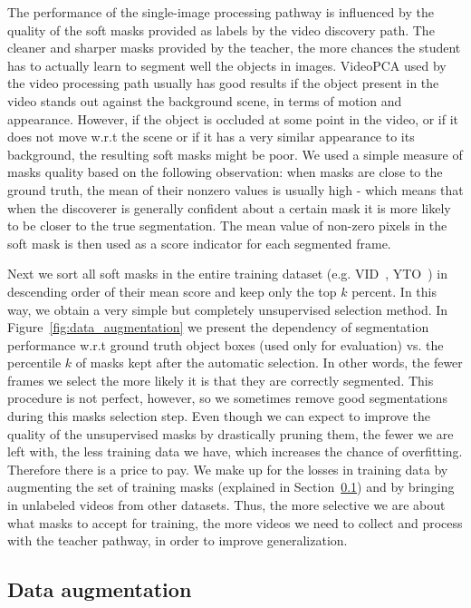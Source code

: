 \documentclass[10pt,twocolumn,letterpaper]{article}
\begin{document}
The performance of the single-image processing pathway is influenced by the quality of the 
soft masks provided as labels by the video discovery path. The cleaner and sharper masks provided by the teacher, the more chances the student has to actually learn to segment well the objects in images. VideoPCA used by the video processing path 
usually has good results if the object present in the video stands out against the background scene, in terms of motion and appearance.
However, if the object
is occluded at some point in the video, or if it does not move w.r.t the scene or if it has a very similar appearance to its background, the resulting soft masks might 
be poor.  We used a simple measure of masks quality based on the following observation: when masks are close to the ground truth, the mean of their nonzero values is usually high - which means that when the discoverer is generally confident about a certain mask it is more likely to be closer to the true segmentation.
The mean value of non-zero pixels in the soft mask 
is then used as a score indicator for each segmented frame. 

Next we sort all soft masks in the entire training dataset (e.g. VID~\cite{russakovsky2015imagenet}, YTO~\cite{prest2012learning}) in descending order of their mean score and keep only the top $k$ percent. In this way, we obtain a very simple but completely unsupervised selection method.
In Figure~\ref{fig:data_augmentation} we present the dependency of segmentation performance w.r.t ground truth object boxes (used only for evaluation) vs. the percentile $k$ of masks kept after the automatic selection. In other words, the fewer frames we select the more likely it is that they are correctly segmented. This procedure is not perfect, however, so we sometimes remove good segmentations during this masks selection step.
Even though we can expect to improve the quality of the unsupervised masks by drastically pruning them, the fewer we are left with, the less training data we have, which increases the chance of overfitting. Therefore there is a price to pay. We make up for the losses in training data by augmenting the set of training masks (explained in Section~\ref{sec:data_augmentation}) and by bringing in unlabeled videos from other datasets. Thus, the more selective we are about what masks to accept for training, the more videos we need to collect and process with the teacher pathway, in order to improve generalization.

\subsection{Data augmentation}\label{sec:data_augmentation}
\end{document}
